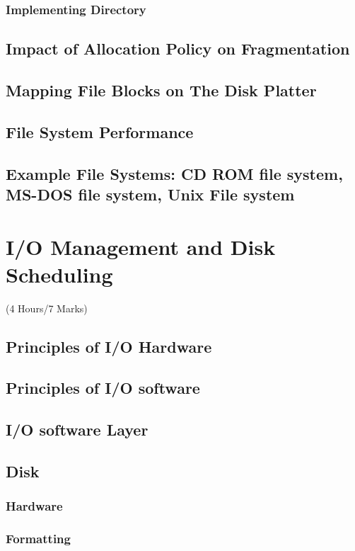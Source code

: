 \documentclass[12pt]{article}
\begin{document}
\subsubsection{Implementing Directory}
\subsection{Impact of Allocation Policy on Fragmentation}
\subsection{Mapping File Blocks on The Disk Platter}
\subsection{File System Performance}
\subsection{Example File Systems: CD ROM file system, MS-DOS file system, Unix File system}

\pagebreak
\section{I/O Management and Disk Scheduling}
\begin{center}(4 Hours/7 Marks)\end{center}
\subsection{Principles of I/O Hardware}
\subsection{Principles of I/O software}
\subsection{I/O software Layer}
\subsection{Disk}
\subsubsection{Hardware}
\subsubsection{Formatting}
\end{document}
